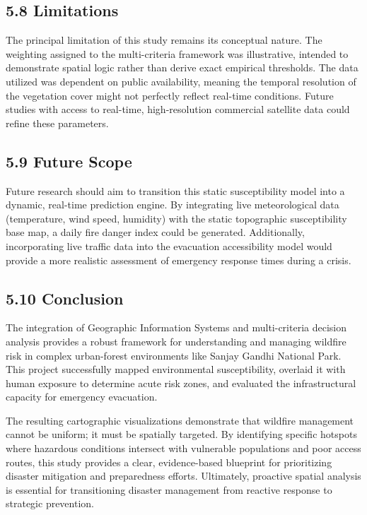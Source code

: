 \documentclass[12pt,a4paper]{article}
\begin{document}
\subsection*{5.8 Limitations}

The principal limitation of this study remains its conceptual nature. The weighting assigned to the multi-criteria framework was illustrative, intended to demonstrate spatial logic rather than derive exact empirical thresholds. The data utilized was dependent on public availability, meaning the temporal resolution of the vegetation cover might not perfectly reflect real-time conditions. Future studies with access to real-time, high-resolution commercial satellite data could refine these parameters.



\subsection*{5.9 Future Scope}

Future research should aim to transition this static susceptibility model into a dynamic, real-time prediction engine. By integrating live meteorological data (temperature, wind speed, humidity) with the static topographic susceptibility base map, a daily fire danger index could be generated. Additionally, incorporating live traffic data into the evacuation accessibility model would provide a more realistic assessment of emergency response times during a crisis.



\subsection*{5.10 Conclusion}

The integration of Geographic Information Systems and multi-criteria decision analysis provides a robust framework for understanding and managing wildfire risk in complex urban-forest environments like Sanjay Gandhi National Park. This project successfully mapped environmental susceptibility, overlaid it with human exposure to determine acute risk zones, and evaluated the infrastructural capacity for emergency evacuation.


The resulting cartographic visualizations demonstrate that wildfire management cannot be uniform; it must be spatially targeted. By identifying specific hotspots where hazardous conditions intersect with vulnerable populations and poor access routes, this study provides a clear, evidence-based blueprint for prioritizing disaster mitigation and preparedness efforts. Ultimately, proactive spatial analysis is essential for transitioning disaster management from reactive response to strategic prevention.
\end{document}
